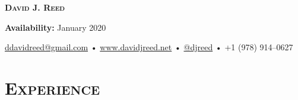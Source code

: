 \documentclass{article}
\begin{document}
\thispagestyle{empty}

\begin{center}
  {\LARGE\textsc{\textbf{David J. Reed}}}
\end{center}

\begin{center}
  \textbf{Availability:}
  January 2020
\end{center}

\begin{center}
  \href{mailto:ddavidreed@gmail.com}{ddavidreed@gmail.com} • \href{https://www.davidjreed.net/}{www.davidjreed.net} • \href{https://github.com/djreed}{@djreed} • +1 (978) 914--0627 \\
  \hrulefill
\end{center}

\section*{\textsc{Experience}}
\end{document}
